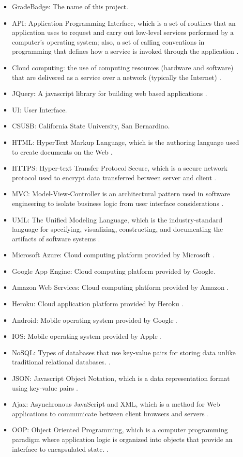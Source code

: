 \begin{itemize}
\item GradeBadge: The name of this project.
\item API: Application Programming Interface, which is a set of routines that an application uses to request and carry out low-level services performed by a computer's operating system; also, a set of calling conventions in programming that defines how a service is invoked through the application \cite{API}.
\item Cloud computing: the use of computing resources (hardware and software) that are delivered as a service over a network (typically the Internet) \cite{cloudcomputing}.
\item JQuery: A javascript library for building web based applications \cite{JQuery}.
\item UI: User Interface.
\item CSUSB: California State University, San Bernardino.
\item HTML: HyperText Markup Language, which is the authoring language used to create documents on the Web \cite{w3}.
\item HTTPS: Hyper-text Transfer Protocol Secure, which is a secure network protocol used to encrypt data transferred  between server and client \cite{https}.
\item MVC\label{def:mvc}: Model-View-Controller is an architectural pattern used in software engineering to isolate business logic from user interface considerations \cite{MVC}.
\item UML: The Unified Modeling Language, which is the industry-standard language for specifying, visualizing, constructing, and documenting the artifacts of software systems \cite{uml}.
\item Microsoft Azure: Cloud computing platform provided by Microsoft \cite{MicrosoftAzure}.
\item Google App Engine: Cloud computing platform provided by Google.
\item Amazon Web Services: Cloud computing platform provided by Amazon \cite{AWS}.
\item Heroku: Cloud application platform provided by Heroku \cite{Heroku}.
\item Android: Mobile operating system provided by Google \cite{Android}.
\item IOS: Mobile operating system provided by Apple \cite{IOS}.
\item NoSQL: Types of databases that use key-value pairs for storing data unlike traditional relational databases. \cite{NoSql}.
\item JSON: Javascript Object Notation, which is a data representation format using key-value pairs \cite{json}.
\item Ajax:  Asynchronous JavaScript and XML, which is a method for Web applications to communicate between client browsers and servers \cite{Ajax}.
\item OOP: Object Oriented Programming, which is a computer programming paradigm where application logic is organized into objects that provide an interface to encapsulated state. \cite{OOP}.
\end{itemize}



